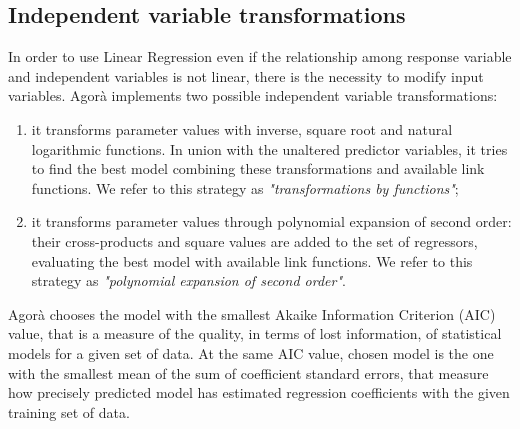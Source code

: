 \subsection{Independent variable transformations}\label{regrTransforms}

In order to use Linear Regression even if the relationship among response variable and independent variables is not linear, there is the necessity to modify input variables. Agorà implements two possible independent variable transformations:

\begin{enumerate}

    \item it transforms parameter values with inverse, square root and natural logarithmic functions. In union with the unaltered predictor variables, it tries to find the best model combining these transformations and available link functions. We refer to this strategy as \textit{"transformations by functions"};
    
    \item it transforms parameter values through polynomial expansion of second order: their cross-products and square values are added to the set of regressors, evaluating the best model with available link functions. We refer to this strategy as \textit{"polynomial expansion of second order"}.

\end{enumerate}

Agorà chooses the model with the smallest Akaike Information Criterion (AIC) value, that is a measure of the quality, in terms of lost information, of statistical models for a given set of data. At the same AIC value, chosen model is the one with the smallest mean of the sum of coefficient standard errors, that measure how precisely predicted model has estimated regression coefficients with the given training set of data.
